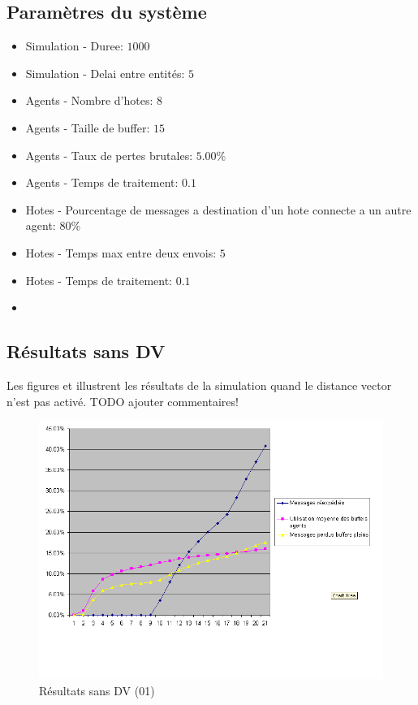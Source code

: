 \documentclass[a4paper,11pt]{article}
\begin{document}
\subsection{Paramètres du système}
\begin{itemize}
 \item Simulation - Duree: $1000$
 \item Simulation - Delai entre entités: $5$
 \item Agents - Nombre d'hotes: $8$
 \item Agents - Taille de buffer: $15$
 \item Agents - Taux de pertes brutales: $5.00$\%
 \item Agents - Temps de traitement: $0.1$
 \item Hotes - Pourcentage de messages a destination d'un hote connecte a un autre agent: $80$\%
 \item Hotes - Temps max entre deux envois: $5$
 \item Hotes - Temps de traitement: $0.1$
 \item 
\end{itemize}

\subsection{Résultats sans DV}
Les figures  et  illustrent les résultats de la simulation quand le distance vector n'est pas activé.
TODO ajouter commentaires!
\begin{figure}[h!t]
  \centering
    \includegraphics[scale=0.55]{sansdv1}
  \caption{Résultats sans DV (01)}
  \label{fig:sansdv01}
\end{figure}
\end{document}
